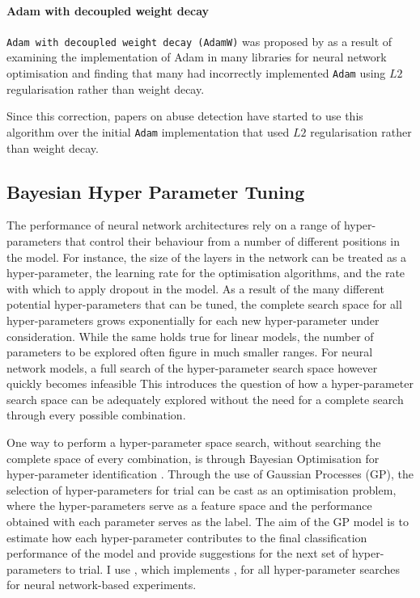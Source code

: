 \paragraph{Adam with decoupled weight decay} \texttt{Adam with decoupled weight decay (AdamW)} was proposed by \citet{Loshchilov:2019} as a result of examining the implementation of Adam in many libraries for neural network optimisation and finding that many had incorrectly implemented \texttt{Adam} using $L2$ regularisation rather than weight decay.

Since this correction, papers on abuse detection have started to use this algorithm \citep{Rottger:2021,Vidgen:2020} over the initial \texttt{Adam} implementation that used $L2$ regularisation rather than weight decay.

\subsection{Bayesian Hyper Parameter Tuning}\label{sub:bho}
The performance of neural network architectures rely on a range of hyper-parameters that control their behaviour from a number of different positions in the model. 
For instance, the size of the layers in the network can be treated as a hyper-parameter, the learning rate for the optimisation algorithms, and the rate with which to apply dropout in the model.
As a result of the many different potential hyper-parameters that can be tuned, the complete search space for all hyper-parameters grows exponentially for each new hyper-parameter under consideration. 
While the same holds true for linear models, the number of parameters to be explored often figure in much smaller ranges. 
For neural network models, a full search of the hyper-parameter search space however quickly becomes infeasible 
This introduces the question of how a hyper-parameter search space can be adequately explored without the need for a complete search through every possible combination. 

One way to perform a hyper-parameter space search, without searching the complete space of every combination, is through Bayesian Optimisation for hyper-parameter identification \citep{Snoek:2012}. 
Through the use of Gaussian Processes (GP), the selection of hyper-parameters for trial can be cast as an optimisation problem, where the hyper-parameters serve as a feature space and the performance obtained with each parameter serves as the label.
The aim of the GP model is to estimate how each hyper-parameter contributes to the final classification performance of the model and provide suggestions for the next set of hyper-parameters to trial.
I use \citet{Wandb}, which implements \citet{Snoek:2012}, for all hyper-parameter searches for neural network-based experiments.

